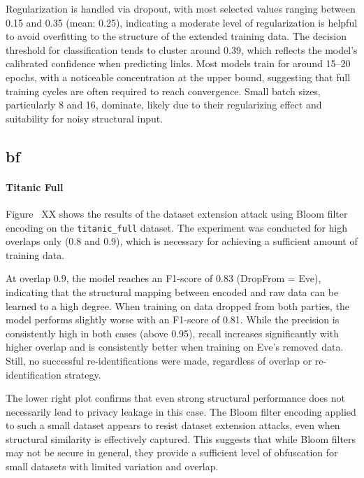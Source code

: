 Regularization is handled via dropout, with most selected values ranging between 0.15 and 0.35 (mean: 0.25), indicating a moderate level of regularization is helpful to avoid overfitting to the structure of the extended training data. The decision threshold for classification tends to cluster around 0.39, which reflects the model's calibrated confidence when predicting links. Most models train for around 15–20 epochs, with a noticeable concentration at the upper bound, suggesting that full training cycles are often required to reach convergence. Small batch sizes, particularly 8 and 16, dominate, likely due to their regularizing effect and suitability for noisy structural input.

\subsection{\ac{bf}}

\paragraph{Titanic Full}

Figure~ XX shows the results of the dataset extension attack using Bloom filter encoding on the \texttt{titanic\_full} dataset. The experiment was conducted for high overlaps only (0.8 and 0.9), which is necessary for achieving a sufficient amount of training data.

At overlap 0.9, the model reaches an F1-score of 0.83 (DropFrom = Eve), indicating that the structural mapping between encoded and raw data can be learned to a high degree. When training on data dropped from both parties, the model performs slightly worse with an F1-score of 0.81. While the precision is consistently high in both cases (above 0.95), recall increases significantly with higher overlap and is consistently better when training on Eve’s removed data. Still, no successful re-identifications were made, regardless of overlap or re-identification strategy.

The lower right plot confirms that even strong structural performance does not necessarily lead to privacy leakage in this case. The Bloom filter encoding applied to such a small dataset appears to resist dataset extension attacks, even when structural similarity is effectively captured. This suggests that while Bloom filters may not be secure in general, they provide a sufficient level of obfuscation for small datasets with limited variation and overlap.



